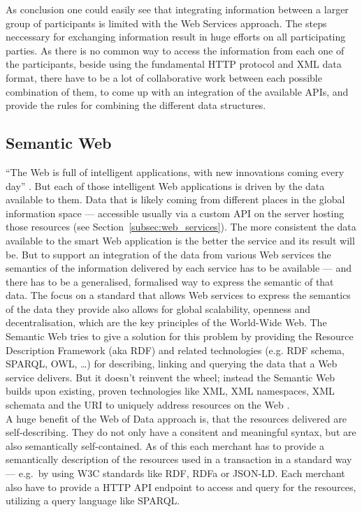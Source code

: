As conclusion one could easily see that integrating information between a larger group of participants is limited with the Web Services approach. The steps neccessary for exchanging information result in huge efforts on all participating parties. As there is no common way to access the information from each one of the participants, beside using the fundamental \gls{HTTP} protocol and \gls{XML} data format, there have to be a lot of collaborative work between each possible combination of them, to come up with an integration of the available \gls{API}s, and provide the rules for combining the different data structures.


\subsection{Semantic Web}
\label{subsec:web_data}

``The Web is full of intelligent applications, with new innovations coming every day'' \citep{allemang2011semantic}. But each of those intelligent Web applications is driven by the data available to them. Data that is likely coming from different places in the global information space — accessible usually via a custom API on the server hosting those resources (see Section~\ref{subsec:web_services}). The more consistent the data available to the smart Web application is the better the service and its result will be. But to support an integration of the data from various Web services the semantics of the information delivered by each service has to be available — and there has to be a generalised, formalised way to express the semantic of that data. The focus on a standard that allows Web services to express the semantics of the data they provide also allows for global scalability, openness and decentralisation, which are the key principles of the World-Wide Web. The Semantic Web tries to give a solution for this problem by providing the Resource Description Framework (aka \gls{RDF}) and related technologies (e.g. RDF schema, SPARQL, OWL, \ldots) for describing, linking and querying the data that a Web service delivers. But it doesn’t reinvent the wheel; instead the Semantic Web builds upon existing, proven technologies like XML, XML namespaces, XML schemata and the \gls{URI} to uniquely address resources on the Web \citep{allemang2011semantic}. \\

A huge benefit of the Web of Data approach is, that the resources delivered are self-describing. They do not only have a consitent and meaningful syntax, but are also semantically self-contained. As of this each merchant has to provide a semantically description of the resources used in a transaction in a standard way --- e.g.\ by using \gls{W3C} standards like \gls{RDF}, \gls{RDFa} or \gls{JSON-LD}. Each merchant also have to provide a \gls{HTTP} \gls{API} endpoint to access and query for the resources, utilizing a query language like \gls{SPARQL}. \\

